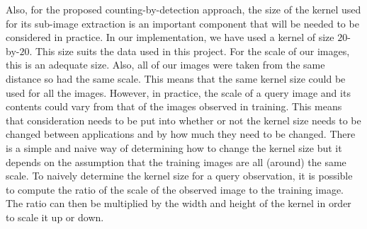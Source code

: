 Also, for the proposed counting-by-detection approach, the size of the kernel used for its sub-image extraction is an important component that will be needed to be considered in practice. In our implementation, we have used a kernel of size $20$-by-$20$. This size suits the data used in this project. For the scale of our images, this is an adequate size. Also, all of our images were taken from the same distance so had the same scale. This means that the same kernel size could be used for all the images. However, in practice, the scale of a query image and its contents could vary from that of the images observed in training. This means that consideration needs to be put into whether or not the kernel size needs to be changed between applications and by how much they need to be changed. There is a simple and naive way of determining how to change the kernel size but it depends on the assumption that the training images are all (around) the same scale. To naively determine the kernel size for a query observation, it is possible to compute the ratio of the scale of the observed image to the training image. The ratio can then be multiplied by the width and height of the kernel in order to scale it up or down.

